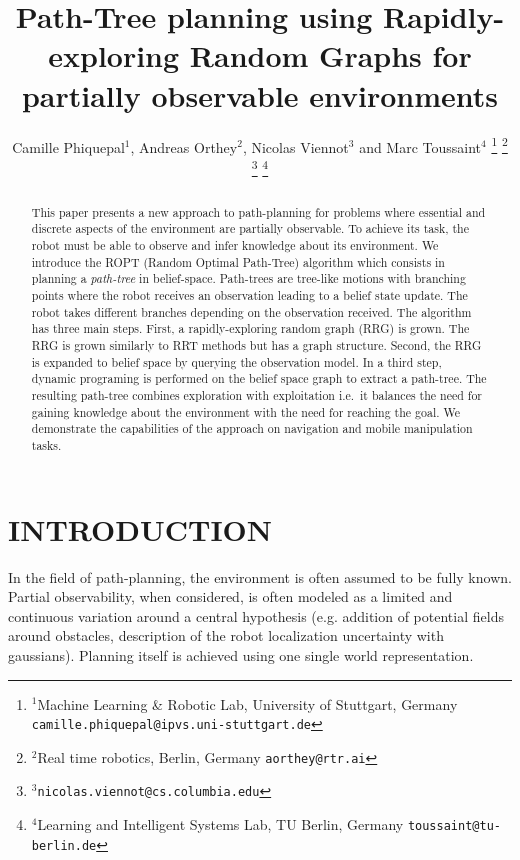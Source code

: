 \documentclass[letterpaper, 10 pt, conference]{ieeeconf}  %
\title{\LARGE \bf
Path-Tree planning using Rapidly-exploring Random Graphs for partially observable environments
}
\author{Camille Phiquepal$^{1}$, Andreas Orthey$^{2}$, Nicolas Viennot$^{3}$ and Marc Toussaint$^{4}$
\thanks{$^{1}$Machine Learning \& Robotic Lab, University of Stuttgart, Germany
        {\tt\small camille.phiquepal@ipvs.uni-stuttgart.de}}
\thanks{$^{2}$Real time robotics, Berlin, Germany
        {\tt\small aorthey@rtr.ai}}
\thanks{$^{3}${\tt\small nicolas.viennot@cs.columbia.edu}}
\thanks{$^{4}$Learning and Intelligent Systems Lab, TU Berlin, Germany
        {\tt\small toussaint@tu-berlin.de}}
}
\begin{document}
\maketitle
\thispagestyle{empty}
\pagestyle{empty}


\begin{abstract}
This paper presents a new approach to path-planning for problems where essential and discrete aspects of the environment are partially observable.
To achieve its task, the robot must be able to observe and infer knowledge about its environment.
We introduce the ROPT (Random Optimal Path-Tree) algorithm which consists in planning a \textit{path-tree} in belief-space. Path-trees are tree-like motions with branching points where the robot receives an observation leading to a belief state update. The robot takes different branches depending on the observation received.
The algorithm has three main steps. First, a rapidly-exploring random graph (RRG) is grown. The RRG is grown similarly to RRT methods but has a graph structure. Second, the RRG is expanded to belief space by querying the observation model. In a third step, dynamic programing is performed on the belief space graph to extract a path-tree. The resulting path-tree combines exploration with exploitation i.e.\ it balances the need for gaining knowledge about the environment with the need for reaching the goal. We demonstrate the capabilities of the approach on navigation and mobile manipulation tasks.
\end{abstract}


\section{INTRODUCTION}
In the field of path-planning, the environment is often assumed to be fully known. Partial observability, when considered, is often modeled as a limited and continuous variation around a central hypothesis  (e.g. addition of potential fields around obstacles, description of the robot localization uncertainty with gaussians). Planning itself is achieved using one single world representation.
\end{document}
